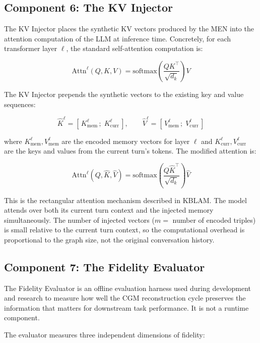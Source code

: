 \documentclass[11pt, a4paper, twoside]{article}
\theoremstyle{definition}
\newcommand{\CGM}{\textsc{CGM}\xspace}
\begin{document}
\subsection{Component 6: The KV Injector}
\label{sec:injector}

The KV Injector places the synthetic KV vectors produced by the MEN into the
attention computation of the LLM at inference time. Concretely, for each
transformer layer $\ell$, the standard self-attention computation is:

\[
\text{Attn}^\ell(Q, K, V) = \text{softmax}\!\left(\frac{Q K^\top}{\sqrt{d_k}}\right) V
\]

The KV Injector prepends the synthetic vectors to the existing key and value
sequences:

\[
\hat{K}^\ell = [\,K_{\text{mem}}^\ell\,;\;K_{\text{curr}}^\ell\,],
\qquad
\hat{V}^\ell = [\,V_{\text{mem}}^\ell\,;\;V_{\text{curr}}^\ell\,]
\]

where $K_{\text{mem}}^\ell, V_{\text{mem}}^\ell$ are the encoded memory vectors
for layer $\ell$ and $K_{\text{curr}}^\ell, V_{\text{curr}}^\ell$ are the
keys and values from the current turn's tokens. The modified attention is:

\[
\text{Attn}^\ell(Q, \hat{K}, \hat{V}) = \text{softmax}\!\left(\frac{Q \hat{K}^\top}{\sqrt{d_k}}\right) \hat{V}
\]

This is the rectangular attention mechanism described in KBLAM. The model attends
over both its current turn context and the injected memory simultaneously. The
number of injected vectors ($m = $ number of encoded triples) is small relative
to the current turn context, so the computational overhead is proportional to
the graph size, not the original conversation history.

\subsection{Component 7: The Fidelity Evaluator}
\label{sec:fidelity}

The Fidelity Evaluator is an offline evaluation harness used during development
and research to measure how well the \CGM reconstruction cycle preserves the
information that matters for downstream task performance. It is not a runtime
component.

\medskip

The evaluator measures three independent dimensions of fidelity:
\end{document}
